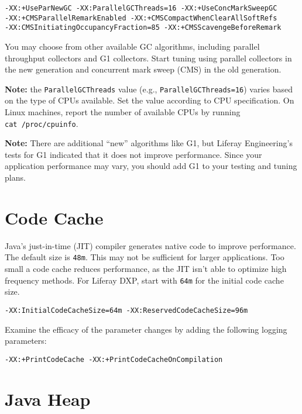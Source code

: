 \begin{verbatim}
-XX:+UseParNewGC -XX:ParallelGCThreads=16 -XX:+UseConcMarkSweepGC
-XX:+CMSParallelRemarkEnabled -XX:+CMSCompactWhenClearAllSoftRefs
-XX:CMSInitiatingOccupancyFraction=85 -XX:+CMSScavengeBeforeRemark
\end{verbatim}

You may choose from other available GC algorithms, including parallel
throughput collectors and G1 collectors. Start tuning using parallel
collectors in the new generation and concurrent mark sweep (CMS) in the
old generation.

\textbf{Note:} the \texttt{ParallelGCThreads} value (e.g.,
\texttt{ParallelGCThreads=16}) varies based on the type of CPUs
available. Set the value according to CPU specification. On Linux
machines, report the number of available CPUs by running
\texttt{cat\ /proc/cpuinfo}.

\textbf{Note:} There are additional ``new'' algorithms like G1, but
Liferay Engineering's tests for G1 indicated that it does not improve
performance. Since your application performance may vary, you should add
G1 to your testing and tuning plans.

\section{Code Cache}\label{code-cache}

Java's just-in-time (JIT) compiler generates native code to improve
performance. The default size is \texttt{48m}. This may not be
sufficient for larger applications. Too small a code cache reduces
performance, as the JIT isn't able to optimize high frequency methods.
For Liferay DXP, start with \texttt{64m} for the initial code cache
size.

\begin{verbatim}
-XX:InitialCodeCacheSize=64m -XX:ReservedCodeCacheSize=96m
\end{verbatim}

Examine the efficacy of the parameter changes by adding the following
logging parameters:

\begin{verbatim}
-XX:+PrintCodeCache -XX:+PrintCodeCacheOnCompilation
\end{verbatim}

\section{Java Heap}\label{java-heap}

